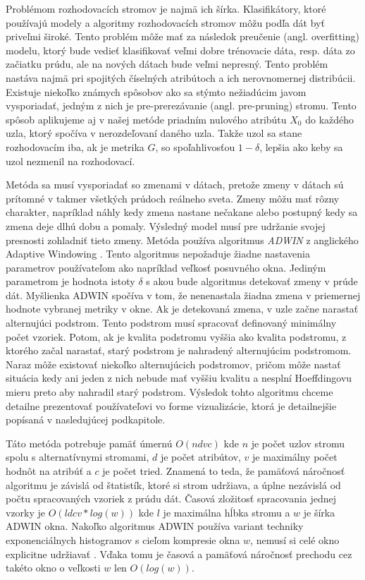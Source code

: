 \par
Problémom rozhodovacích stromov je najmä ich šírka. Klasifikátory, ktoré používajú modely a algoritmy rozhodovacích stromov môžu podľa dát byť priveľmi široké. Tento problém môže mať za následok preučenie (angl. overfitting) modelu, ktorý bude vedieť klasifikovať veľmi dobre trénovacie dáta, resp. dáta zo začiatku prúdu, ale na nových dátach bude veľmi nepresný. Tento problém nastáva najmä pri spojitých číselných atribútoch a ich nerovnomernej distribúcii. Existuje niekoľko známych spôsobov ako sa stýmto nežiadúcim javom vysporiadať, jedným z nich je pre-prerezávanie (angl. pre-pruning) stromu. Tento spôsob aplikujeme aj v našej metóde priadním nulového atribútu $X_0$ do každého uzla, ktorý spočíva v nerozdeľovaní daného uzla. Takže uzol sa stane rozhodovacím iba, ak je metrika $G$, so spoľahlivosťou $1-\delta$, lepšia ako keby sa uzol nezmenil na rozhodovací.
\par
Metóda sa musí vysporiadať so zmenami v dátach, pretože zmeny v dátach sú prítomné v takmer všetkých prúdoch reálneho sveta. Zmeny môžu mať rôzny charakter, napríklad náhly kedy zmena nastane nečakane alebo postupný kedy sa zmena deje dlhú dobu a pomaly. Výsledný model musí pre udržanie svojej presnosti zohladniť tieto zmeny. Metóda používa algoritmus \textit{ADWIN} z anglického Adaptive Windowing \citep{Hutchison2009}. Tento algoritmus nepožaduje žiadne nastavenia parametrov používateľom ako napríklad veľkosť posuvného okna. Jediným parametrom je hodnota istoty $\delta$ s akou bude algoritmus detekovať zmeny v prúde dát. Myšlienka ADWIN spočíva v tom, že nenenastala žiadna zmena v priemernej hodnote vybranej metriky v okne. Ak je detekovaná zmena, v uzle začne narastať alternujúci podstrom. Tento podstrom musí spracovať definovaný minimálny počet vzoriek. Potom, ak je kvalita podstromu vyššia ako kvalita podstromu, z ktorého začal narastať, starý podstrom je nahradený alternujúcim podstromom. Naraz môže existovať niekoľko alternujúcich podstromov, pričom môže nastať situácia kedy ani jeden z nich nebude mať vyššiu kvalitu a nesplní Hoeffdingovu mieru preto aby nahradil starý podstrom. Výsledok tohto algoritmu chceme detailne prezentovať používateľovi vo forme vizualizácie, ktorá je detailnejšie popísaná v nasledujúcej podkapitole. 
\par
Táto metóda potrebuje pamäť úmernú $O(ndvc)$ kde $n$ je počet uzlov stromu spolu s alternatívnymi stromami, $d$ je počet atribútov, $v$ je maximálny počet hodnôt na atribúť a $c$ je počet tried. Znamená to teda, že pamäťová náročnosť algoritmu je závislá od štatistík, ktoré si strom udržiava, a úplne nezávislá od počtu spracovaných vzoriek z prúdu dát. Časová zložitosť spracovania jednej vzorky je $O(ldcv * log(w))$ kde $l$ je maximálna hĺbka stromu a $w$ je šírka ADWIN okna. Nakoľko algoritmus ADWIN používa variant techniky exponenciálnych histogramov s cieľom kompresie okna $w$, nemusí si celé okno explicitne udržiavať \citep{datar2002maintaining}. Vďaka tomu je časová a pamäťová náročnosť prechodu cez takéto okno o veľkosti $w$ len $O(log(w))$.
